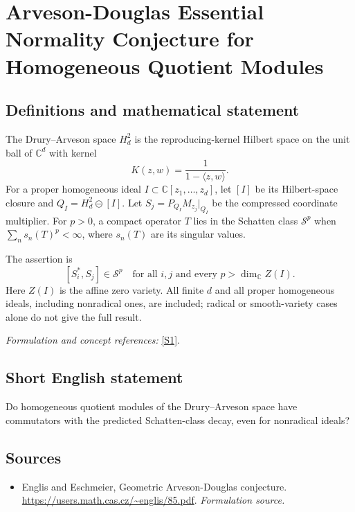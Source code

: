 \documentclass[11pt]{article}
\begin{document}
\section*{\texorpdfstring{Arveson-Douglas Essential Normality Conjecture for Homogeneous Quotient Modules}{Arveson-Douglas Essential Normality Conjecture for Homogeneous Quotient Modules}}\label{463}
\subsection{Definitions and mathematical statement}
The Drury--Arveson space $H_d^2$ is the reproducing-kernel Hilbert space on the unit ball of ${\mathbb{C}}^d$ with kernel
\[
 K(z,w)=\frac1{1-\langle z,w\rangle}.
\]
For a proper homogeneous ideal $I\subset{\mathbb{C}}[z_1,\ldots,z_d]$, let $[I]$ be its Hilbert-space closure and $Q_I=H_d^2\ominus[I]$. Let $S_j=P_{Q_I}M_{z_j}|_{Q_I}$ be the compressed coordinate multiplier. For $p>0$, a compact operator $T$ lies in the Schatten class $\mathcal S^p$ when $\sum_ns_n(T)^p<\infty$, where $s_n(T)$ are its singular values.

The assertion is
\[
 [S_i^*,S_j]\in\mathcal S^p
 \quad\text{for all }i,j\text{ and every }p>\dim_{{\mathbb{C}}} Z(I).
\]
Here $Z(I)$ is the affine zero variety. All finite $d$ and all proper homogeneous ideals, including nonradical ones, are included; radical or smooth-variety cases alone do not give the full result.
\par\smallskip\textit{Formulation and concept references:} \href{https://users.math.cas.cz/~englis/85.pdf}{[S1]}.

\subsection{Short English statement}
Do homogeneous quotient modules of the Drury--Arveson space have commutators with the predicted Schatten-class decay, even for nonradical ideals?
\subsection{Sources}
\begin{itemize}
\item[S1]Englis and Eschmeier, Geometric Arveson-Douglas conjecture.
\url{https://users.math.cas.cz/~englis/85.pdf}.
\textit{Formulation source.}
\end{itemize}
\end{document}
